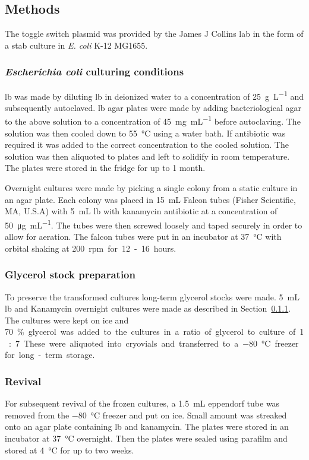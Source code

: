 \subsection{Methods}
\label{sec:experimental_methods}
The toggle switch plasmid was provided by the James J Collins lab in the form of a stab culture in \textit{E. coli} K-12 MG1655.

\subsubsection{\textit{Escherichia coli} culturing conditions}
\label{sec:overnigh_cult}

\acrfull{lb} was made by diluting \acrshort{lb} in deionized water to a concentration of \SI{25}{\gram\per\liter} and subsequently autoclaved. \acrshort{lb} agar plates were made by adding bacteriological agar to the above solution to a concentration of \SI{45}{\milli\gram\per\milli\liter} before autoclaving. The solution was then cooled down to \SI{55}{\celsius} using a water bath. If antibiotic was required it was added to the correct concentration to the cooled solution. The solution was then aliquoted to plates and left to solidify in room temperature. The plates were stored in the fridge for up to 1 month. 


Overnight cultures were made by picking a single colony from a static culture in an agar plate. Each colony was placed in \SI{15}{\milli\liter} Falcon tubes (Fisher Scientific, MA, U.S.A) with \SI{5}{\milli\liter} \acrshort{lb} with kanamycin antibiotic at a concentration of \SI{50}{\micro\gram\per\milli\liter}. The tubes were then screwed loosely and taped securely in order to allow for aeration. The falcon tubes were put in an incubator at \SI{37}{\celsius} with orbital shaking at \SI{200} rpm for 12-16 hours. 

\subsubsection{Glycerol stock preparation}
\label{sec:glycerol_stock}
To preserve the transformed cultures long-term glycerol stocks were made. \SI{5}{\milli\liter} \acrshort{lb} and Kanamycin overnight cultures were made as described in Section~\ref{sec:overnigh_cult}. The cultures were kept on ice and \SI{70}\% glycerol was added to the cultures in a ratio of glycerol to culture of 1:7. These were aliquoted into cryovials and transferred to a \SI{-80}{\celsius} freezer for long-term storage.


\subsubsection{Revival}
For subsequent revival of the frozen cultures, a \SI{1.5}{\milli\liter} eppendorf tube was removed from the \SI{-80}{\celsius} freezer and put on ice. Small amount was streaked onto an agar plate containing \acrshort{lb} and kanamycin. The plates were stored in an incubator at \SI{37}{\celsius} overnight. Then the plates were sealed using parafilm and stored at \SI{4}{\celsius} for up to two weeks. 



